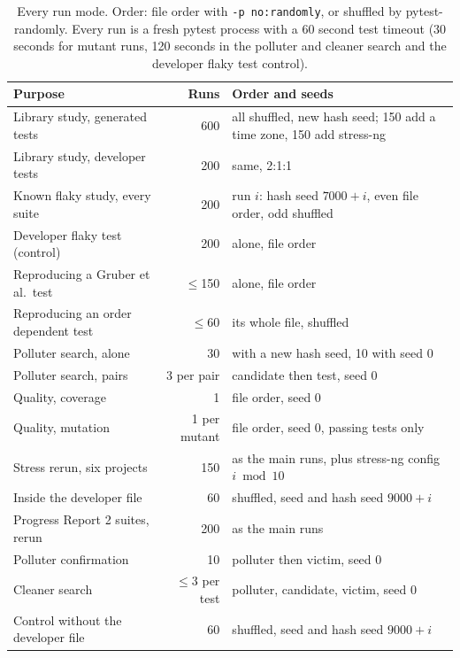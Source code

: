 \begin{table}[htbp]
\caption{Every run mode. Order: file order with \texttt{-p no:randomly}, or shuffled by pytest-randomly. Every run is a fresh pytest process with a 60 second test timeout (30 seconds for mutant runs, 120 seconds in the polluter and cleaner search and the developer flaky test control).}
\label{tab:runmodes}
\small
\setlength{\tabcolsep}{2pt}
\begin{tabularx}{\columnwidth}{>{\raggedright\arraybackslash}Xr>{\raggedright\arraybackslash}p{3.6cm}}
\toprule
Purpose & Runs & Order and seeds \\
\midrule
Library study, generated tests & 600 & all shuffled, new hash seed; 150 add a time zone, 150 add stress-ng \\
Library study, developer tests & 200 & same, 2:1:1 \\
Known flaky study, every suite & 200 & run $i$: hash seed $7000+i$, even file order, odd shuffled \\
Developer flaky test (control) & 200 & alone, file order \\
Reproducing a Gruber et al.\ test & $\le$150 & alone, file order \\
Reproducing an order dependent test & $\le$60 & its whole file, shuffled \\
Polluter search, alone & 30 & 20 with a new hash seed, 10 with seed 0 \\
Polluter search, pairs & 3 per pair & candidate then test, seed 0 \\
Quality, coverage & 1 & file order, seed 0 \\
Quality, mutation & 1 per mutant & file order, seed 0, passing tests only \\
Stress rerun, six projects & 150 & as the main runs, plus stress-ng config $i \bmod 10$ \\
Inside the developer file & 60 & shuffled, seed and hash seed $9000+i$ \\
Progress Report 2 suites, rerun & 200 & as the main runs \\
Polluter confirmation & 10 & polluter then victim, seed 0 \\
Cleaner search & $\le$3 per test & polluter, candidate, victim, seed 0 \\
Control without the developer file & 60 & shuffled, seed and hash seed $9000+i$ \\
\bottomrule
\end{tabularx}
\end{table}

